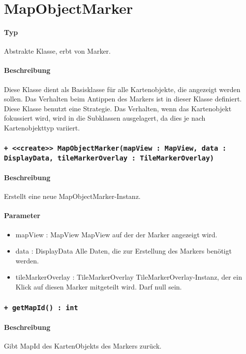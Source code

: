 \section{MapObjectMarker}
\paragraph*{Typ}
Abstrakte Klasse, erbt von Marker.
\paragraph*{Beschreibung}
Diese Klasse dient als Basisklasse für alle Kartenobjekte, die angezeigt werden sollen.
Das Verhalten beim Antippen des Markers ist in dieser Klasse definiert.
Diese Klasse benutzt eine Strategie. Das Verhalten, wenn das Kartenobjekt fokussiert wird,
wird in die Subklassen ausgelagert, da dies je nach Kartenobjekttyp variiert.

\subsubsection{\texttt{+ <<create>> MapObjectMarker(mapView : MapView, data : DisplayData, tileMarkerOverlay : TileMarkerOverlay)}}%
\paragraph*{Beschreibung}
Erstellt eine neue MapObjectMarker-Instanz.
\paragraph*{Parameter}
\begin{itemize}
    \item mapView : MapView MapView auf der der Marker angezeigt wird.
    \item data : DisplayData Alle Daten, die zur Erstellung des Markers benötigt werden.
    \item tileMarkerOverlay : TileMarkerOverlay TileMarkerOverlay-Instanz, der ein Klick 
    auf diesen Marker mitgeteilt wird. Darf null sein.
\end{itemize}

\subsubsection{\texttt{+ getMapId() : int}}%
\paragraph*{Beschreibung}
Gibt MapId des KartenObjekts des Markers zurück.
